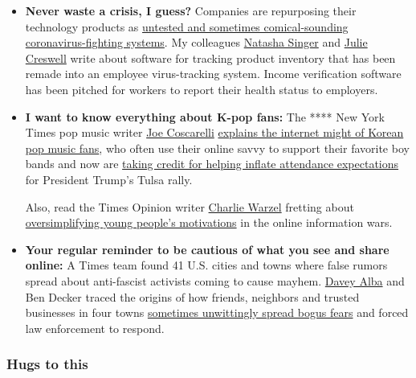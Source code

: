 \begin{itemize}
\item
  \textbf{Never waste a crisis, I guess?} Companies are repurposing
  their technology products as
  \href{https://www.nytimes3xbfgragh.onion/2020/06/22/business/virus-office-workplace-return.html}{untested
  and sometimes comical-sounding coronavirus-fighting systems}. My
  colleagues
  \href{https://www.nytimes3xbfgragh.onion/by/natasha-singer}{Natasha
  Singer} and
  \href{https://www.nytimes3xbfgragh.onion/by/julie-creswell}{Julie
  Creswell} write about software for tracking product inventory that has
  been remade into an employee virus-tracking system. Income
  verification software has been pitched for workers to report their
  health status to employers.
\item
  \textbf{I want to know everything about K-pop fans:} The **** New York
  Times pop music writer
  \href{https://www.nytimes3xbfgragh.onion/by/joe-coscarelli}{Joe
  Coscarelli}
  \href{https://www.nytimes3xbfgragh.onion/2020/06/22/arts/music/k-pop-fans-trump-politics.html}{explains
  the internet might of Korean pop music fans}, who often use their
  online savvy to support their favorite boy bands and now are
  \href{https://www.nytimes3xbfgragh.onion/2020/06/21/style/tiktok-trump-rally-tulsa.html}{taking
  credit for helping inflate attendance expectations} for President
  Trump's Tulsa rally.

  Also, read the Times Opinion writer
  \href{https://www.nytimes3xbfgragh.onion/by/charlie-warzel}{Charlie
  Warzel} fretting about
  \href{https://www.nytimes3xbfgragh.onion/2020/06/22/opinion/trump-protest-gen-z.html}{oversimplifying
  young people's motivations} in the online information wars.
\item
  \textbf{Your regular reminder to be cautious of what you see and share
  online:} A Times team found 41 U.S. cities and towns where false
  rumors spread about anti-fascist activists coming to cause mayhem.
  \href{https://www.nytimes3xbfgragh.onion/by/davey-alba}{Davey Alba}
  and Ben Decker traced the origins of how friends, neighbors and
  trusted businesses in four towns
  \href{https://www.nytimes3xbfgragh.onion/2020/06/22/technology/antifa-local-disinformation.html}{sometimes
  unwittingly spread bogus fears} and forced law enforcement to respond.
\end{itemize}

\hypertarget{hugs-to-this}{%
\subsubsection{Hugs to this}\label{hugs-to-this}}


